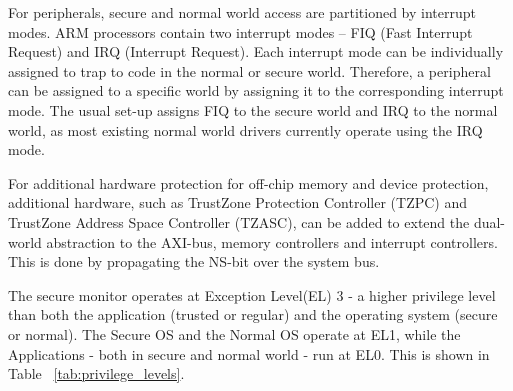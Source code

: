 For peripherals, secure and normal world access are partitioned by interrupt modes. 
ARM processors contain two interrupt modes -- FIQ (Fast Interrupt Request) and IRQ (Interrupt Request). Each interrupt mode can be individually assigned to trap to code in the normal or secure world. Therefore, a peripheral can be assigned to a specific world by assigning it to the corresponding interrupt mode. The usual set-up 
assigns FIQ to the secure world and IRQ to the normal world, as most existing normal world drivers 
currently operate using the IRQ mode.

For additional hardware protection for off-chip memory and device protection, additional hardware, 
such as TrustZone Protection Controller (TZPC) and TrustZone Address Space Controller (TZASC), can
be added to extend the dual-world abstraction to the AXI-bus, memory controllers and interrupt controllers. This is done by propagating the NS-bit over the system bus. 


\begin{table}[]
\centering
{}
\caption{The privilege levels at which the various components of the TrustZone based system run. The Secure Monitor runs at the highest privilege.}
\label{tab:privilege_levels}
\end{table}

The secure monitor operates at Exception Level(EL) 3 - a higher privilege level than both the application (trusted or regular) and the operating system (secure or normal). The Secure OS and the Normal OS operate at EL1, while the Applications - both in secure and normal world - run at EL0. This is shown in Table ~\ref{tab:privilege_levels}.


